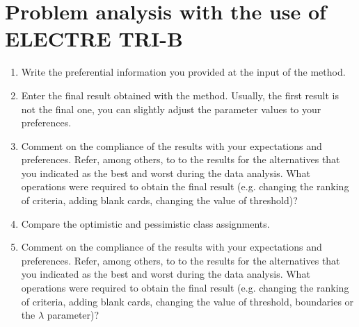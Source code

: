 \documentclass{article}
\begin{document}

\section{Problem analysis with the use of ELECTRE TRI-B}

\begin{enumerate}

    \item Write the preferential information you provided at the input of the method.

    \item Enter the final result obtained with the method. Usually, the first result is not the final one, you can
    slightly adjust the parameter values to your preferences.

    \item Comment on the compliance of the results with your expectations and preferences. Refer, among
    others, to to the results for the alternatives that you indicated as the best and worst during the data
    analysis. What operations were required to obtain the final result (e.g. changing the ranking of criteria,
    adding blank cards, changing the value of threshold)?

    \item Compare the optimistic and pessimistic class assignments.

    \item Comment on the compliance of the results with your expectations and preferences. Refer, among
    others, to to the results for the alternatives that you indicated as the best and worst during the data
    analysis. What operations were required to obtain the final result (e.g. changing the ranking of criteria,
    adding blank cards, changing the value of threshold, boundaries or the $\lambda$ parameter)?

\end{enumerate}
\end{document}
